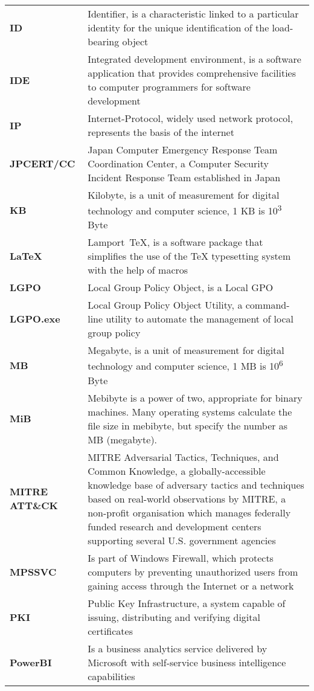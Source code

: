 \begin{longtable}{ p{4cm}  p{12cm} }
    \textbf{ID} & Identifier, is a characteristic linked to a particular identity for the unique identification of the load-bearing object\\
    \textbf{IDE} & Integrated development environment, is a software application that provides comprehensive facilities to computer programmers for software development\\
    \textbf{IP} & Internet-Protocol, widely used network protocol, represents the basis of the internet\\
    \textbf{JPCERT/CC} & Japan Computer Emergency Response Team Coordination Center, a Computer Security Incident Response Team established in Japan\\
    \textbf{KB} & Kilobyte,  is a unit of measurement for digital technology and computer science, 1 KB is 10\textsuperscript{3} Byte\\
    \textbf{LaTeX} & Lamport TeX, is a software package that simplifies the use of the TeX typesetting system with the help of macros\\
    \textbf{LGPO} & Local Group Policy Object, is a Local GPO\\
    \textbf{LGPO.exe} & Local Group Policy Object Utility, a command-line utility to automate the management of local group policy\\
    \textbf{MB} & Megabyte,  is a unit of measurement for digital technology and computer science, 1 MB is 10\textsuperscript{6} Byte\\
    \textbf{MiB} & Mebibyte is a power of two, appropriate for binary machines. Many operating systems calculate the file size in mebibyte, but specify the number as MB (megabyte). \\
    \textbf{MITRE ATT\&CK} & MITRE Adversarial Tactics, Techniques, and Common Knowledge, a globally-accessible knowledge base of adversary tactics and techniques based on real-world observations by MITRE, a non-profit organisation which manages federally funded research and development centers supporting several U.S. government agencies\\
    \textbf{MPSSVC} & Is part of Windows Firewall, which protects computers by preventing unauthorized users from gaining access through the Internet or a network\\
    \textbf{PKI} & Public Key Infrastructure,  a system capable of issuing, distributing and verifying digital certificates\\
    \textbf{PowerBI} & Is a business analytics service delivered by Microsoft with self-service business intelligence capabilities\\

\end{longtable}
